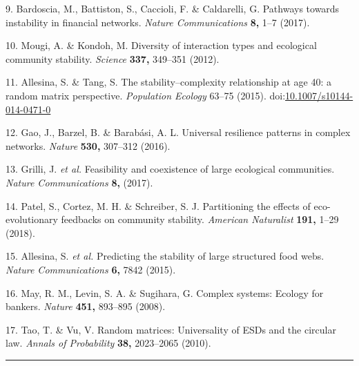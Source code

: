 \documentclass[]{article}
\begin{document}
\hypertarget{ref-Bardoscia2017}{}
9. Bardoscia, M., Battiston, S., Caccioli, F. \& Caldarelli, G. Pathways
towards instability in financial networks. \emph{Nature Communications}
\textbf{8,} 1--7 (2017).

\hypertarget{ref-Mougi2012}{}
10. Mougi, A. \& Kondoh, M. Diversity of interaction types and
ecological community stability. \emph{Science} \textbf{337,} 349--351
(2012).

\hypertarget{ref-Allesina2015a}{}
11. Allesina, S. \& Tang, S. The stability--complexity relationship at
age 40: a random matrix perspective. \emph{Population Ecology} 63--75
(2015).
doi:\href{https://doi.org/10.1007/s10144-014-0471-0}{10.1007/s10144-014-0471-0}

\hypertarget{ref-Gao2016}{}
12. Gao, J., Barzel, B. \& Barabási, A. L. Universal resilience patterns
in complex networks. \emph{Nature} \textbf{530,} 307--312 (2016).

\hypertarget{ref-Grilli2017}{}
13. Grilli, J. \emph{et al.} Feasibility and coexistence of large
ecological communities. \emph{Nature Communications} \textbf{8,} (2017).

\hypertarget{ref-Patel2018}{}
14. Patel, S., Cortez, M. H. \& Schreiber, S. J. Partitioning the
effects of eco-evolutionary feedbacks on community stability.
\emph{American Naturalist} \textbf{191,} 1--29 (2018).

\hypertarget{ref-Allesina2015}{}
15. Allesina, S. \emph{et al.} Predicting the stability of large
structured food webs. \emph{Nature Communications} \textbf{6,} 7842
(2015).

\hypertarget{ref-May2008}{}
16. May, R. M., Levin, S. A. \& Sugihara, G. Complex systems: Ecology
for bankers. \emph{Nature} \textbf{451,} 893--895 (2008).

\hypertarget{ref-Tao2010}{}
17. Tao, T. \& Vu, V. Random matrices: Universality of ESDs and the
circular law. \emph{Annals of Probability} \textbf{38,} 2023--2065
(2010).

\begin{center}\rule{0.5\linewidth}{\linethickness}\end{center}
\end{document}
